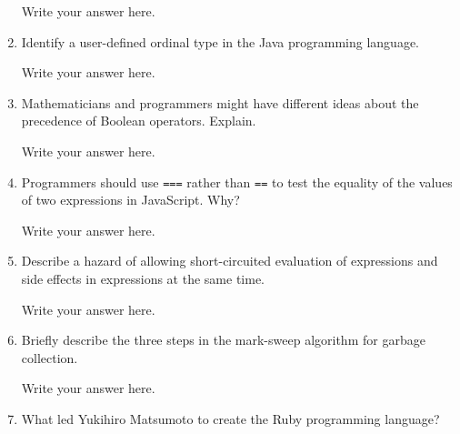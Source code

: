 \begin{enumerate}
  \begin{answer}

    Write your answer here.

    \end{answer}

  \item Identify a user-defined ordinal type in the Java programming
    language.

  \begin{answer}

    Write your answer here.

    \end{answer}

  \item Mathematicians and programmers might have different ideas
    about the precedence of Boolean operators. Explain.

  \begin{answer}

    Write your answer here.

    \end{answer}

  \item Programmers should use \verb+===+ rather than \verb+==+ to
    test the equality of the values of two expressions in JavaScript. Why?

  \begin{answer}

    Write your answer here.

    \end{answer}

  \item Describe a hazard of allowing short-circuited evaluation
    of expressions and side effects in expressions at the same time.

  \begin{answer}

    Write your answer here.

    \end{answer}

  \item Briefly describe the three steps in the mark-sweep algorithm
    for garbage collection.

  \begin{answer}

    Write your answer here.

    \end{answer}

  \item What led Yukihiro Matsumoto to create the Ruby programming language?


\end{enumerate}
